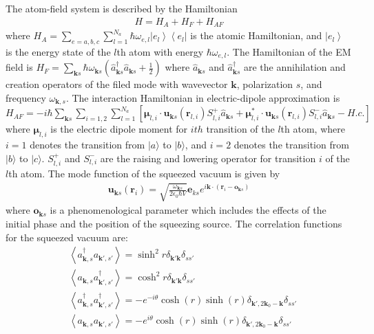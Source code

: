 \documentclass[aps,showpacs,twocolumn,twoside,groupedaddress]{revtex4}
\let\vec\bm
\begin{document}
The atom-field system is described by the Hamiltonian \begin{equation}
  \label{eq1}
  \begin{gathered}
H=H_{A}+H_{F}+H_{AF}
 \end{gathered}
\end{equation}
where
$H_{A}=\sum_{e=a,b,c}\sum_{l=1}^{N_a}\hbar\omega_{e,l}\left|e_{l}\right\rangle \left\langle e_{l}\right|$  
is the atomic Hamiltonian, and $ \left|e_{l}\right\rangle $ is the energy state of the $l$th atom with energy $\hbar\omega_{e,l}$. The Hamiltonian of the EM field is
$H_{F}=\sum_{\vec{k}s}\hbar\omega_{\vec{k}s}(\hat{a}_{\vec{k}s}^{\dagger}\hat{a}_{\vec{k}s}+\frac{1}{2})$
where $\hat{a}_{\vec{k}s}$ and $\hat{a}_{\vec{k}s}^{\dagger}$ are the annihilation and creation operators of the filed mode with wavevector $ \vec{k}$, polarization $s$, and frequency $\omega_{\vec{k},s}$. The interaction Hamiltonian in electric-dipole approximation is
$H_{AF}=-i\hbar\sum_{\vec{k}s}\sum_{i=1,2}\sum_{l=1}^{N_{a}}[\vec{\mu}_{l,i}\cdot\vec{u}_{\vec{k}s}(\vec{r}_{l,i})S_{l,i}^{+}\hat{a}_{\vec{k}s}+\vec{\mu}_{l,i}^{*}\cdot\vec{u}_{\vec{k}s}(\vec{r}_{l,i})S_{l,i}^{-}\hat{a}_{\vec{k}s}-H.c.]$
where $ \vec{\mu}_{l,i} $ is the electric dipole moment for $ith$ transition of the $l$th atom, where $i=1$ denotes the transition from $|a\rangle$ to $|b\rangle$, and $i=2$ denotes the transition from $|b\rangle$ to $|c\rangle$. $ S_{l,i}^{+} $ and $S_{l,i}^{-} $ are the raising and lowering operator for transition $i$ of the $l$th atom. The mode function of the squeezed vacuum is given by
\begin{equation}
  \label{eq2b}
  \begin{gathered}
\vec{u}_{\vec{k}s}(\vec{r}_{i})=\sqrt{\frac{\omega_{\vec{k}s}}{2\epsilon_{0}\hbar V}}\vec{e}_{ks}e^{i\vec{k}\cdot(\vec{r}_{i}-\vec{o}_{\vec{k}s})}
 \end{gathered}
\end{equation}
where $\vec{o}_{\vec{k}s} $ is a phenomenological parameter which includes the effects of the initial phase and the position of the squeezing source\cite{You2018}. The correlation functions for the squeezed vacuum are\cite{scully1999quantum}:
\begin{equation}
\label{eq0a}
\begin{split}
& \left\langle a_{\vec{k},s}^{\dagger}a_{\vec{k}',s'}\right\rangle =\sinh^{2}r\delta_{\vec{k}'\vec{k}}\delta_{ss'} \\
& \left\langle a_{\vec{k},s}a_{\vec{k}',s'}^{\dagger}\right\rangle =\cosh^{2}r\delta_{\vec{k}'\vec{k}}\delta_{ss'}\\
& \left\langle a_{\vec{k},s}^{\dagger}a_{\vec{k}',s'}^{\dagger}\right\rangle =-e^{-i\theta}\cosh(r)\sinh(r)\delta_{\vec{k}',2\vec{k}_{0}-\vec{k}}\delta_{ss'}\\
&\left\langle a_{\vec{k},s}a_{\vec{k}',s'}\right\rangle =-e^{i\theta}\cosh(r)\sinh(r)\delta_{\vec{k}',2\vec{k}_{0}-\vec{k}}\delta_{ss'}
\end{split}
\end{equation}
\end{document}
